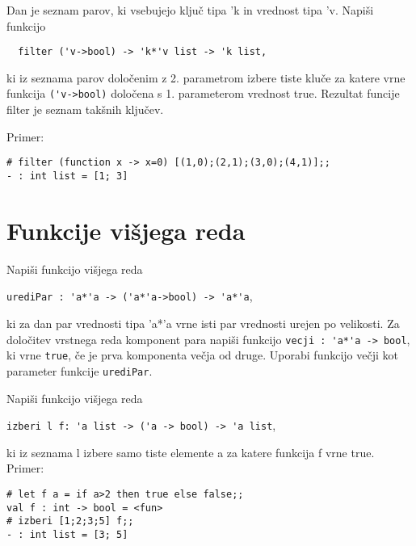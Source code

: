 \begin{ex}
  Dan je seznam parov, ki vsebujejo klju\v c tipa 'k in vrednost tipa
  'v. Napi\v si funkcijo
\begin{lstlisting}
  filter ('v->bool) -> 'k*'v list -> 'k list,
\end{lstlisting}
  ki iz seznama parov dolo\v cenim z 2. parametrom izbere tiste klu\v
  ce za katere vrne funkcija \lstinline{('v->bool)} dolo\v cena s 1. parameterom
  vrednost true. Rezultat funcije filter je seznam tak\v snih klju\v
  cev.

\noindent\/Primer:
\begin{lstlisting}
# filter (function x -> x=0) [(1,0);(2,1);(3,0);(4,1)];; 
- : int list = [1; 3] 

\end{lstlisting}
\end{ex} 



\section{Funkcije vi\v sjega reda}



\begin{ex}
Napi\v si funkcijo vi\v sjega reda 
\begin{center}
\lstinline{urediPar : 'a*'a -> ('a*'a->bool) -> 'a*'a}, 
\end{center}
ki za dan par vrednosti tipa 'a*'a vrne isti par vrednosti urejen po velikosti. Za dolo\v citev vrstnega reda komponent para napi\v si funkcijo 
\lstinline{vecji : 'a*'a -> bool}, 
ki vrne \lstinline{true}, \v ce je prva komponenta ve\v cja od druge. Uporabi funkcijo ve\v cji kot parameter funkcije \lstinline{urediPar}.

\end{ex}
\begin{ex}
Napi\v si funkcijo vi\v sjega reda 
\begin{center}
\lstinline{izberi l f: 'a list -> ('a -> bool) -> 'a list},
\end{center}
ki iz seznama l izbere samo
tiste elemente a za katere funkcija f vrne true.
Primer: 
\begin{lstlisting}
# let f a = if a>2 then true else false;;
val f : int -> bool = <fun>
# izberi [1;2;3;5] f;;
- : int list = [3; 5]
\end{lstlisting}
\end{ex}



